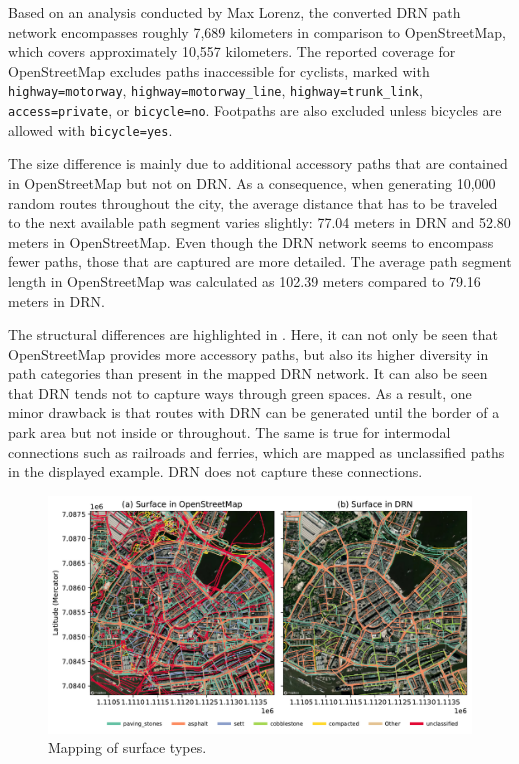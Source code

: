 Based on an analysis conducted by Max Lorenz, the converted DRN path network encompasses roughly 7,689 kilometers in comparison to OpenStreetMap, which covers approximately 10,557 kilometers. The reported coverage for OpenStreetMap excludes paths inaccessible for cyclists, marked with \texttt{highway=motorway}, \texttt{highway=motorway\_line}, \texttt{highway=trunk\_link}, \texttt{access=private}, or \texttt{bi\allowbreak cycle=no}. Footpaths are also excluded unless bicycles are allowed with \texttt{bicycle=yes}. 

The size difference is mainly due to additional accessory paths that are contained in OpenStreetMap but not on DRN. As a consequence, when generating 10,000 random routes throughout the city, the average distance that has to be traveled to the next available path segment varies slightly: 77.04 meters in DRN and 52.80 meters in OpenStreetMap. Even though the DRN network seems to encompass fewer paths, those that are captured are more detailed. The average path segment length in OpenStreetMap was calculated as 102.39 meters compared to 79.16 meters in DRN.

The structural differences are highlighted in . Here, it can not only be seen that OpenStreetMap provides more accessory paths, but also its higher diversity in path categories than present in the mapped DRN network. It can also be seen that DRN tends not to capture ways through green spaces. As a result, one minor drawback is that routes with DRN can be generated until the border of a park area but not inside or throughout. The same is true for intermodal connections such as railroads and ferries, which are mapped as unclassified paths in the displayed example. DRN does not capture these connections.

\begin{figure}[t]
\centering
\includegraphics[width=\linewidth]{images/routing-drn-osm-map-surfaces.pdf} 
\caption{Mapping of surface types.}
\label{fig:routing-drn-osm-map-surfaces}
\end{figure}

